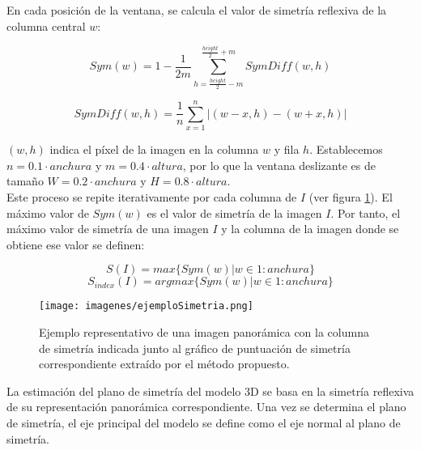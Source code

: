 En cada posición de la ventana, se calcula el valor de simetría reflexiva de la columna central $w$:

\begin{equation}
    Sym(w) = 1 - \frac{1}{2m} \sum_{h=\frac{height}{2}-m}^{\frac{height}{2}+m} SymDiff(w,h)
\end{equation}

\begin{equation}
    SymDiff(w,h) = \frac{1}{n} \sum_{x=1}^{n} |(w-x,h) - (w+x,h)|
\end{equation}

$(w,h)$ indica el píxel de la imagen en la columna $w$ y fila $h$. Establecemos $n = 0.1 \cdot anchura$ y $m = 0.4 \cdot altura$, por lo que la ventana deslizante es de tamaño $W = 0.2 \cdot anchura$ y $H = 0.8 \cdot altura$.\\

Este proceso se repite iterativamente por cada columna de $I$ (ver figura \ref{fig:ejemploSimetria}). El máximo valor de $Sym(w)$ es el valor de simetría de la imagen $I$. Por tanto, el máximo valor de simetría de una imagen $I$ y la columna de la imagen donde se obtiene ese valor se definen:

\begin{equation}
    S(I) = max\{Sym(w)|w\in1:anchura\}
\end{equation}
\begin{equation}
    S_{index}(I) = argmax\{Sym(w)|w\in1:anchura\}
\end{equation}

\begin{figure}[ht]
    \centering
    \texttt{[image: imagenes/ejemploSimetria.png]}
    \caption{Ejemplo representativo de una imagen panorámica con la columna de simetría indicada junto al gráfico de puntuación de simetría correspondiente extraído por el método propuesto.}
    \label{fig:ejemploSimetria}
\end{figure}


La estimación del plano de simetría del modelo 3D se basa en la simetría reflexiva de su representación panorámica correspondiente. Una vez se determina el plano de simetría, el eje principal del modelo se define como el eje normal al plano de simetría.\\

